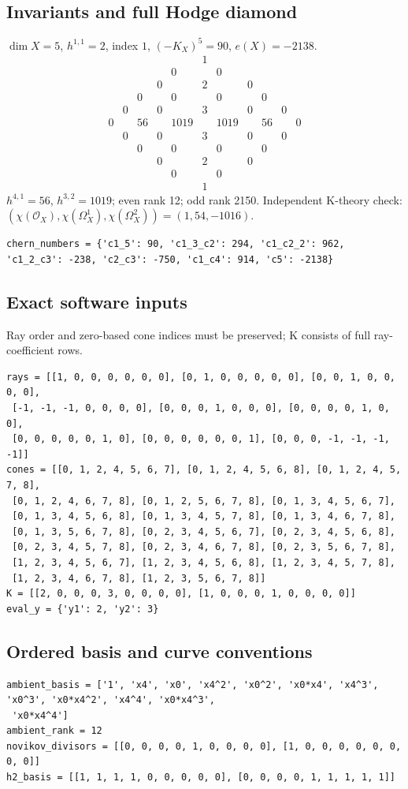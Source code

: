 \documentclass[10pt,a4paper]{article}
\begin{document}
\subsection*{Invariants and full Hodge diamond}
$\dim X=5$, $h^{1,1}=2$, index $1$, $(-K_X)^5=90$, $e(X)=-2138$.
\[\begin{array}{ccccccccccc}&&&&&1&&&&&\\&&&&0&&0&&&&\\&&&0&&2&&0&&&\\&&0&&0&&0&&0&&\\&0&&0&&3&&0&&0&\\0&&56&&1019&&1019&&56&&0\\&0&&0&&3&&0&&0&\\&&0&&0&&0&&0&&\\&&&0&&2&&0&&&\\&&&&0&&0&&&&\\&&&&&1&&&&&\end{array}\]
$h^{4,1}=56$, $h^{3,2}=1019$; even rank 12; odd rank 2150.
Independent K-theory check: $(\chi(\mathcal O_X),\chi(\Omega_X^1),\chi(\Omega_X^2))=(1, 54, -1016)$.
\begin{lstlisting}
chern_numbers = {'c1_5': 90, 'c1_3_c2': 294, 'c1_c2_2': 962, 'c1_2_c3': -238, 'c2_c3': -750, 'c1_c4': 914, 'c5': -2138}
\end{lstlisting}
\subsection*{Exact software inputs}
Ray order and zero-based cone indices must be preserved; K consists of full ray-coefficient rows.
\begin{lstlisting}
rays = [[1, 0, 0, 0, 0, 0, 0], [0, 1, 0, 0, 0, 0, 0], [0, 0, 1, 0, 0, 0, 0],
 [-1, -1, -1, 0, 0, 0, 0], [0, 0, 0, 1, 0, 0, 0], [0, 0, 0, 0, 1, 0, 0],
 [0, 0, 0, 0, 0, 1, 0], [0, 0, 0, 0, 0, 0, 1], [0, 0, 0, -1, -1, -1, -1]]
cones = [[0, 1, 2, 4, 5, 6, 7], [0, 1, 2, 4, 5, 6, 8], [0, 1, 2, 4, 5, 7, 8],
 [0, 1, 2, 4, 6, 7, 8], [0, 1, 2, 5, 6, 7, 8], [0, 1, 3, 4, 5, 6, 7],
 [0, 1, 3, 4, 5, 6, 8], [0, 1, 3, 4, 5, 7, 8], [0, 1, 3, 4, 6, 7, 8],
 [0, 1, 3, 5, 6, 7, 8], [0, 2, 3, 4, 5, 6, 7], [0, 2, 3, 4, 5, 6, 8],
 [0, 2, 3, 4, 5, 7, 8], [0, 2, 3, 4, 6, 7, 8], [0, 2, 3, 5, 6, 7, 8],
 [1, 2, 3, 4, 5, 6, 7], [1, 2, 3, 4, 5, 6, 8], [1, 2, 3, 4, 5, 7, 8],
 [1, 2, 3, 4, 6, 7, 8], [1, 2, 3, 5, 6, 7, 8]]
K = [[2, 0, 0, 0, 3, 0, 0, 0, 0], [1, 0, 0, 0, 1, 0, 0, 0, 0]]
eval_y = {'y1': 2, 'y2': 3}
\end{lstlisting}
\subsection*{Ordered basis and curve conventions}
\begin{lstlisting}
ambient_basis = ['1', 'x4', 'x0', 'x4^2', 'x0^2', 'x0*x4', 'x4^3', 'x0^3', 'x0*x4^2', 'x4^4', 'x0*x4^3',
 'x0*x4^4']
ambient_rank = 12
novikov_divisors = [[0, 0, 0, 0, 1, 0, 0, 0, 0], [1, 0, 0, 0, 0, 0, 0, 0, 0]]
h2_basis = [[1, 1, 1, 1, 0, 0, 0, 0, 0], [0, 0, 0, 0, 1, 1, 1, 1, 1]]
\end{lstlisting}
\end{document}
